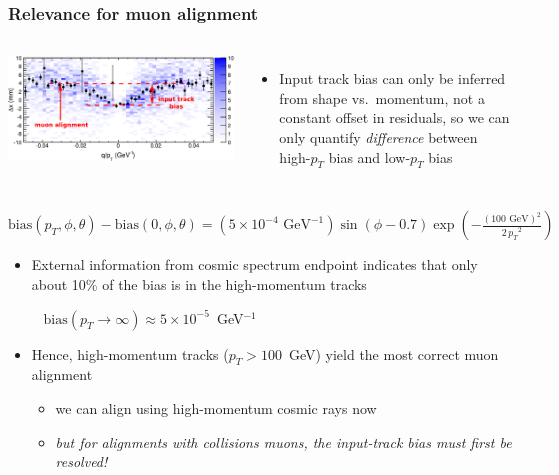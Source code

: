 \documentclass[compress]{beamer}
\begin{document}
\begin{frame}
\frametitle{Relevance for muon alignment}

\begin{columns}
\includegraphics[width=1.1\linewidth]{residuals_breakup.pdf}

\begin{itemize}
\item Input track bias can only be inferred from shape vs.\ momentum,
  not a constant offset in residuals, so we can only quantify {\it
    difference} between high-$p_T$ bias and low-$p_T$ bias
\end{itemize}
\end{columns}

{\hspace{0 cm}\begin{minipage}{1.2\linewidth}\scriptsize
$\displaystyle \mbox{bias}(p_T, \phi, \theta) - \mbox{bias}(0, \phi, \theta) = (5\times 10^{-4}\mbox{ GeV}^{-1}) \sin(\phi - 0.7) \exp\left(-\frac{(100\mbox{ GeV})^2}{{2 \, p_T}^2}\right)$
\end{minipage}\mbox{\hspace{-3 cm}}}

\begin{itemize}
\item External information from cosmic spectrum endpoint indicates
  that only about 10\% of the bias is in the high-momentum tracks

\mbox{ } \hfill {\scriptsize $\displaystyle \mbox{bias}(p_T \to \infty) \approx 5\times 10^{-5}$~GeV$^{-1}$} \hfill \mbox{ }

\item Hence, high-momentum tracks ($p_T > 100$~GeV) yield the most correct muon alignment
\begin{itemize}
\item we can align using high-momentum cosmic rays now
\item {\it but for alignments with collisions muons, the input-track bias must first be resolved!}
\end{itemize}
\end{itemize}
\end{frame}
\end{document}
